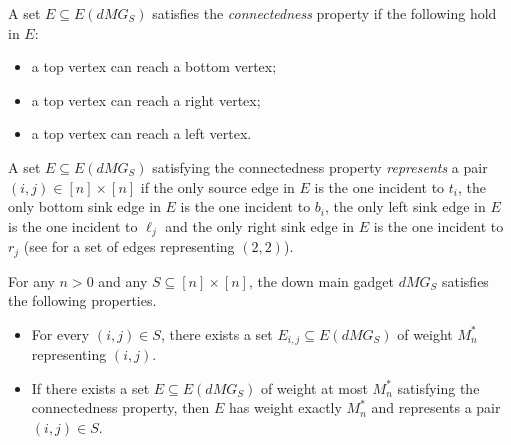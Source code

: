 \noindent
A set $E \subseteq E(dMG_S)$ satisfies the \emph{connectedness} property if the following hold in $E$: 
\begin{itemize}
\item a top vertex can reach a bottom vertex;
\item a top vertex can reach a right vertex; 
\item a top vertex can reach a left vertex.
\end{itemize}
A set $E \subseteq E(dMG_S)$ satisfying the connectedness property \emph{represents} a pair $(i,j) \in [n] \times [n]$ if the only source edge in $E$ is the one incident to $t_i$, the only bottom sink edge in $E$ is the one incident to $b_i$, the only left sink edge in $E$ is the one incident to $\ell_j$ and the only right sink edge in $E$ is the one incident to $r_j$ (see  for a set of edges representing $(2,2)$).

\begin{lemma}
\label{lem:dmg}
For any $n > 0$ and any $S \subseteq [n] \times [n]$, the down main gadget $dMG_S$ satisfies the following properties.
\begin{itemize}
\item[(1)] For every $(i,j) \in S$, there exists a set $E_{i,j} \subseteq E(dMG_S)$ of weight $M_n^*$ representing $(i,j)$.
\item[(2)] If there exists a set $E \subseteq E(dMG_S)$ of weight at most $M_n^*$ satisfying the connectedness property, then $E$ has weight exactly $M_n^*$ and represents a pair $(i,j) \in S$.
\end{itemize}
\end{lemma}

